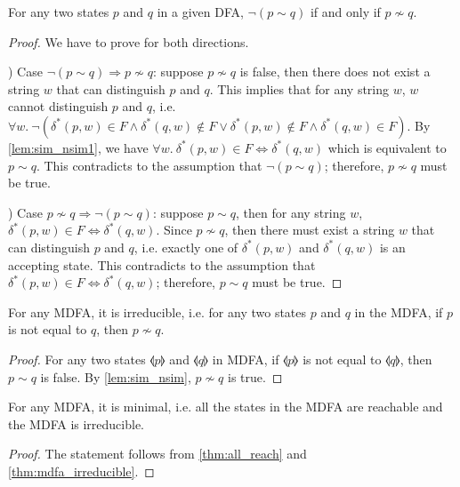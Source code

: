 \begin{lem}
\label{lem:sim_nsim}
\noindent For any two states \(p\) and \(q\) in a given DFA, \(\neg (p
\sim q)\) if and only if \(p \nsim q\). 
\end{lem}

\begin{proof}
\noindent We have to prove for both directions.

\par {}) Case \(\neg (p \sim q) \Rightarrow p \nsim
q\): suppose \(p \nsim q\) is false, then there does not exist a
string \(w\) that can distinguish \(p\) and \(q\). This implies that for any string \(w\), \(w\) cannot
distinguish \(p\) and \(q\), i.e. \(\forall w.\ \neg (\delta^*(p,w) \in F \wedge \delta^*(q,w) \notin F \vee
\delta^*(p,w) \notin F \wedge \delta^*(q,w) \in F)\). By
\autoref{lem:sim_nsim1}, we have \(\forall w.\ \delta^*(p,w) \in F
\Leftrightarrow \delta^*(q,w)\) which is equivalent to \(p \sim
q\). This contradicts to the assumption that \(\neg (p \sim q)\);
therefore, \(p \nsim q\) must be true. 

\par {}) Case \(p \nsim q \Rightarrow \neg (p \sim q)\): suppose \(p \sim q\), then for any string \(w\),
\(\delta^*(p,w) \in F \Leftrightarrow \delta^*(q,w)\). Since \(p \nsim
q\), then there must exist a string \(w\)
that can distinguish \(p\) and \(q\), i.e. exactly one of
\(\delta^*(p,w)\) and \(\delta^*(q,w)\) is an accepting state. This
contradicts to the assumption that \(\delta^*(p,w) \in F
\Leftrightarrow \delta^*(q,w)\); therefore, \(p \sim q\) must be true. 
\end{proof}

\begin{thm}
\label{thm:mdfa_irreducible}
\noindent For any MDFA, it is irreducible, i.e. for any two states
\(p\) and \(q\) in the MDFA, if \(p\) is not equal to \(q\), then \(p \nsim q\). 
\end{thm}

\begin{proof}
\noindent For any two states \(\llangle p \rrangle\) and \(\llangle q
\rrangle\) in MDFA, if \(\llangle p \rrangle\) is not equal to \(\llangle q
\rrangle\), then \(p \sim q\) is false. By \autoref{lem:sim_nsim},
\(p \nsim q\) is true. 
\end{proof}

\begin{thm}
\noindent For any MDFA, it is minimal, i.e. all the states in the MDFA
are reachable and the MDFA is irreducible. 
\end{thm}

\begin{proof}
\noindent The statement follows from \autoref{thm:all_reach}
and \autoref{thm:mdfa_irreducible}. 
\end{proof}


